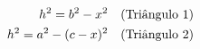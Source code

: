 \documentclass[preview]{standalone}
\begin{document}
\begin{align*}
\special{dvisvgm:raw <g id='unique000'>}h^2 = b^2 - x^2 \quad \text{(Triângulo 1)}\\ \special{dvisvgm:raw </g>}\special{dvisvgm:raw <g id='unique001'>}h^2 = a^2 - (c - x)^2 \quad \text{(Triângulo 2)}\special{dvisvgm:raw </g>}
\end{align*}
\end{document}
